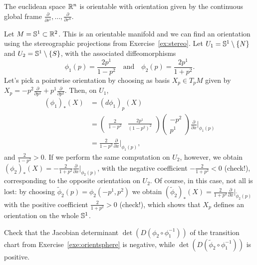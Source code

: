 \begin{example}
  The euclidean space $\mathbb{R}^n$ is orientable with orientation given by the continuous global frame $\frac{\partial}{\partial r^i},\ldots,\frac{\partial}{\partial r^n}$.
\end{example}

\begin{example}\label{exe:orientsphere}
  Let $M = \mathbb{S}^1\subset \mathbb{R}^2$.
  This is an orientable manifold and we can find an orientation using the stereographic projections from Exercise~\ref{ex:stereo}.
  Let $U_1 = \mathbb{S}^1\setminus\{N\}$ and $U_2 = \mathbb{S}^1\setminus\{S\}$, with the associated diffeomorphisms
  \begin{equation}
    \phi_1(p) = \frac{2p^1}{1-p^2}
    \quad\mbox{and}\quad
    \phi_2(p) = \frac{2p^1}{1+p^2}.
  \end{equation}
  Let's pick a pointwise orientation by choosing as basis $X_p\in T_pM$ given by $X_p = -p^2 \frac{\partial}{\partial p^1} + p^1 \frac{\partial}{\partial p^2}$.
  Then, on $U_1$,
  \begin{align}
    (\phi_1)_*(X) &= (d\phi_1)_p(X) \\
    &= \left(\begin{smallmatrix}
      \frac{2}{1-p^2} & \frac{2p^1}{(1-p^2)^2}
    \end{smallmatrix}\right)
    \left(\begin{smallmatrix}
      -p^2 \\ p^1
    \end{smallmatrix}\right) \frac{\partial}{\partial x}\Big|_{\phi_1(p)}\\
    &= \frac{2}{1-p^2} \frac{\partial}{\partial x}\Big|_{\phi_1(p)},
  \end{align}
  and $\frac{2}{1-p^2}>0$.
  If we perform the same computation on $U_2$, however, we obtain $(\phi_2)_*(X) = -\frac{2}{1+p^2}\frac{\partial}{\partial x}\Big|_{\phi_2(p)}$, with the negative coefficient $-\frac{2}{1+p^2} < 0$ (check!), corresponding to the opposite orientation on $U_2$.
  Of course, in this case, not all is lost: by choosing $\widetilde\phi_2(p) = \phi_2(-p^1, p^2)$ we obtain $(\widetilde\phi_2)_*(X) = \frac{2}{1+p^2} \frac{\partial}{\partial x}\Big|_{\widetilde\phi_2(p)}$ with the positive coefficient $\frac{2}{1+p^2} > 0$ (check!), which shows that $X_p$ defines an orientation on the whole $\mathbb{S}^1$.
\end{example}

\begin{exercise}
  Check that the Jacobian determinant $\det(D(\phi_2\circ \phi_1^{-1}))$ of the transition chart from Exercise~\ref{exe:orientsphere} is negative, while $\det(D(\widetilde\phi_2\circ \phi_1^{-1}))$ is positive.
\end{exercise}

